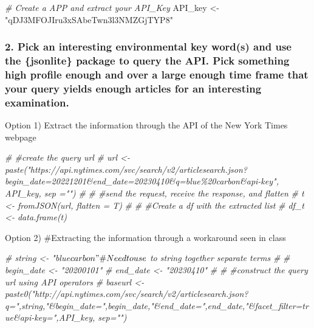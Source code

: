 \documentclass[
]{article}
\newenvironment{Shaded}{\begin{snugshade}}{\end{snugshade}}
\newcommand{\CommentTok}[1]{\textcolor[rgb]{0.56,0.35,0.01}{\textit{#1}}}
\newcommand{\NormalTok}[1]{#1}
\newcommand{\OtherTok}[1]{\textcolor[rgb]{0.56,0.35,0.01}{#1}}
\newcommand{\StringTok}[1]{\textcolor[rgb]{0.31,0.60,0.02}{#1}}
\begin{document}
\begin{Shaded}
\begin{Highlighting}[]
\CommentTok{\# Create a APP and extract your API\_Key}
\NormalTok{API\_key }\OtherTok{\textless{}{-}} \StringTok{"qDJ3MFOJIru3xSAbeTwn3l3NMZGjTYP8"}
\end{Highlighting}
\end{Shaded}

\hypertarget{pick-an-interesting-environmental-key-words-and-use-the-jsonlite-package-to-query-the-api.-pick-something-high-profile-enough-and-over-a-large-enough-time-frame-that-your-query-yields-enough-articles-for-an-interesting-examination.}{%
\subsubsection{2. Pick an interesting environmental key word(s) and use
the \{jsonlite\} package to query the API. Pick something high profile
enough and over a large enough time frame that your query yields enough
articles for an interesting
examination.}\label{pick-an-interesting-environmental-key-words-and-use-the-jsonlite-package-to-query-the-api.-pick-something-high-profile-enough-and-over-a-large-enough-time-frame-that-your-query-yields-enough-articles-for-an-interesting-examination.}}

Option 1) Extract the information through the API of the New York Times
webpage

\begin{Shaded}
\begin{Highlighting}[]
\CommentTok{\# \#create the query url}
\CommentTok{\# url \textless{}{-} paste("https://api.nytimes.com/svc/search/v2/articlesearch.json?begin\_date=20221201\&end\_date=20230410\&q=blue\%20carbon\&api{-}key", API\_key, sep ="")}
\CommentTok{\# }
\CommentTok{\# \#send the request, receive the response, and flatten}
\CommentTok{\# t \textless{}{-} fromJSON(url, flatten = T)}
\CommentTok{\# }
\CommentTok{\# \#Create a df with the extracted list}
\CommentTok{\# df\_t \textless{}{-} data.frame(t)}
\end{Highlighting}
\end{Shaded}

Option 2) \#Extracting the information through a workaround seen in
class

\begin{Shaded}
\begin{Highlighting}[]
\CommentTok{\# string \textless{}{-} "blue$carbon" \# Need to use $ to string together separate terms }
\CommentTok{\# }
\CommentTok{\# begin\_date \textless{}{-} "20200101"}
\CommentTok{\# end\_date \textless{}{-} "20230410"}
\CommentTok{\# }
\CommentTok{\# \#construct the query url using API operators}
\CommentTok{\# baseurl \textless{}{-} paste0("http://api.nytimes.com/svc/search/v2/articlesearch.json?q=",string,"\&begin\_date=",begin\_date,"\&end\_date=",end\_date,"\&facet\_filter=true\&api{-}key=",API\_key, sep="")}
\end{Highlighting}
\end{Shaded}
\end{document}
